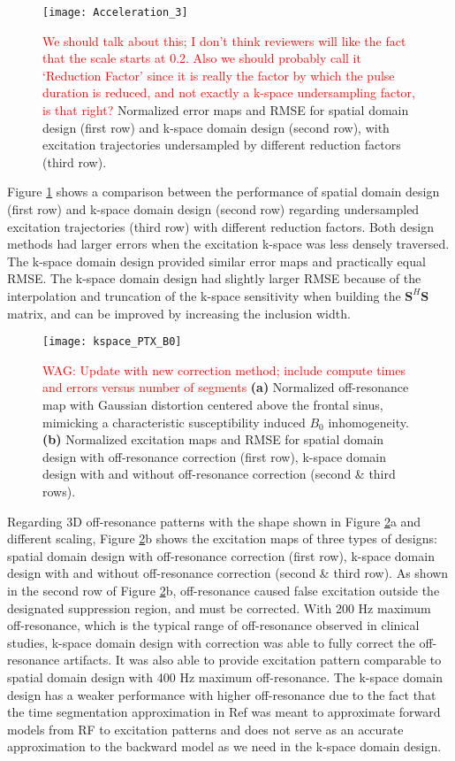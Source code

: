 \begin{figure}
	\centering
	\texttt{[image: Acceleration\_3]}
	\caption{ \textcolor{red}{We should talk about this; I don't think reviewers will like the fact that the scale starts at 0.2. Also we should probably call it `Reduction Factor' since it is 
	really the factor by which the pulse duration is reduced, and not exactly a k-space undersampling factor, is that right?}
	Normalized error maps and RMSE for spatial domain design (first row) and k-space domain design (second row), with excitation trajectories undersampled by different reduction factors (third row).}
	\label{fig:kspace_PTX_Acceleration}
\end{figure}

Figure \ref{fig:kspace_PTX_Acceleration} shows a comparison between the performance of spatial domain design (first row) and k-space domain design (second row) regarding undersampled excitation trajectories (third row) with different reduction factors. Both design methods had larger errors when the excitation k-space was less densely traversed. The k-space domain design provided similar error maps and practically equal RMSE. The k-space domain design had slightly larger RMSE because of the interpolation and truncation of the k-space sensitivity when building the $\mathbf{S}^{H}\mathbf{S}$ matrix, and can be improved by increasing the inclusion width. 


\begin{figure}
	\centering
	\texttt{[image: kspace\_PTX\_B0]}
	\caption{\textcolor{red}{WAG: Update with new correction method; include compute times and errors versus number of segments}
	\textbf{(a)} Normalized off-resonance map with Gaussian distortion centered above the frontal sinus, mimicking a characteristic susceptibility induced $B_0$ inhomogeneity. \textbf{(b)} Normalized excitation maps and RMSE for spatial domain design with off-resonance correction (first row), k-space domain design with and without off-resonance correction (second \& third rows).}
	\label{fig:kspace_PTX_B0}
\end{figure}

Regarding 3D off-resonance patterns with the shape shown in Figure \ref{fig:kspace_PTX_B0}a and different scaling, Figure \ref{fig:kspace_PTX_B0}b shows the excitation maps of three types of designs: spatial domain design with off-resonance correction (first row), k-space domain design with and without off-resonance correction (second \& third row). As shown in the second row of Figure \ref{fig:kspace_PTX_B0}b, off-resonance caused false excitation outside the designated suppression region, and must be corrected. With 200 Hz maximum off-resonance, which is the typical range of off-resonance observed in clinical studies, k-space domain design with correction was able to fully correct the off-resonance artifacts. It was also able to provide excitation pattern comparable to spatial domain design with 400 Hz maximum off-resonance. The k-space domain design has a weaker performance with higher off-resonance due to the fact that the time segmentation approximation in Ref \cite{fessler2005toeplitz} was meant to approximate forward models from RF to excitation patterns and does not serve as an accurate approximation to the backward model as we need in the k-space domain design.